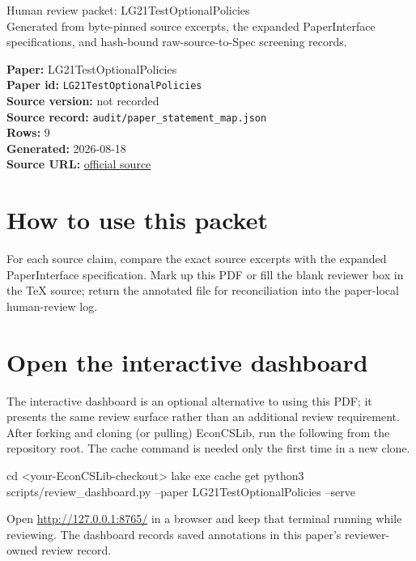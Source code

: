 \documentclass[10pt]{article}
\begin{document}
\fontsize{9}{10}\selectfont

\begin{center}
{\LARGE Human review packet: LG21TestOptionalPolicies}\\[0.35em]
\small Generated from byte-pinned source excerpts, the expanded PaperInterface
specifications, and hash-bound raw-source-to-Spec screening records.
\end{center}

\noindent\textbf{Paper:} LG21TestOptionalPolicies\\
\textbf{Paper id:} \texttt{LG21TestOptionalPolicies}\\
\textbf{Source version:} not recorded\\
\textbf{Source record:} \texttt{audit/paper\_statement\_map.json}\\
\textbf{Rows:} 9\\
\textbf{Generated:} 2026-08-18\\
\textbf{Source URL:} \href{https://arxiv.org/abs/2107.08922}{official source}

\noindent{}\par



\section*{How to use this packet}
For each source claim, compare the exact source excerpts with the expanded
PaperInterface specification. Mark up this PDF or fill the blank reviewer box in the TeX source;
return the annotated file for reconciliation into the paper-local human-review
log.

\section*{Open the interactive dashboard}
The interactive dashboard is an optional alternative to using this PDF; it
presents the same review surface rather than an additional review requirement.
After forking and cloning (or pulling) EconCSLib, run the following from the
repository root. The cache command is needed only the first time in a new clone.
\begin{ReviewVerbatim}
cd <your-EconCSLib-checkout>
lake exe cache get
python3 scripts/review_dashboard.py --paper LG21TestOptionalPolicies --serve
\end{ReviewVerbatim}
Open \url{http://127.0.0.1:8765/} in a browser and keep that terminal running
while reviewing. The dashboard records saved annotations in this paper's
reviewer-owned review record.
\end{document}

